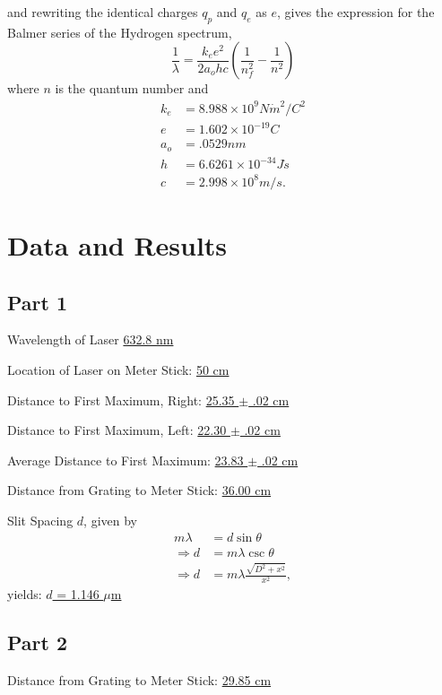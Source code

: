 \documentclass[twocolumn,english]{IEEEtran}
\theoremstyle{plain}
\theoremstyle{plain}
\begin{document}
and rewriting the identical charges $q_p$ and $q_e$ as $e$, gives the expression for the Balmer series of the Hydrogen spectrum,
\begin{equation}
	\frac{1}{\lambda} = \frac{k_e e^2}{2a_o h c}\left( \frac{1}{n_f^2} - \frac{1}{n^2}\right)
\end{equation}
where $n$ is the quantum number and
\begin{align*}
k_e &= 8.988\times10^9 N\dot m^2/C^2 \\
e&= 1.602\times 10^{-19} C \\
a_o &= .0529 nm \\
h&=6.6261\times 10^{-34}J\dot s \\
c&=2.998\times10^8 m/s.
\end{align*}


\noindent\hrulefill

\section{Data and Results}
\subsection{Part 1}

Wavelength of Laser \hfill\underline{632.8 nm}

Location of Laser on Meter Stick: \hfill\underline{50 cm}

Distance to First Maximum, Right: \hfill\underline{25.35 $\pm$ .02 cm}

Distance to First Maximum, Left: \hfill\underline{22.30 $\pm$ .02 cm}

Average Distance to First Maximum: \hfill\underline{23.83 $\pm$ .02 cm}

Distance from Grating to Meter Stick: \hfill\underline{36.00 cm}

Slit Spacing $d$, given by
\begin{align*}
	m\lambda &= d\sin\theta \\
	\Rightarrow d &= m\lambda\csc\theta \\
	\Rightarrow d &= m\lambda\frac{\sqrt{D^2 + x^2}}{x^2},
\end{align*}
yields: \hfill\underline{$d$ = 1.146 $\mu$m}



\subsection{Part 2}
Distance from Grating to Meter Stick: \hfill\underline{29.85 cm}
\end{document}
